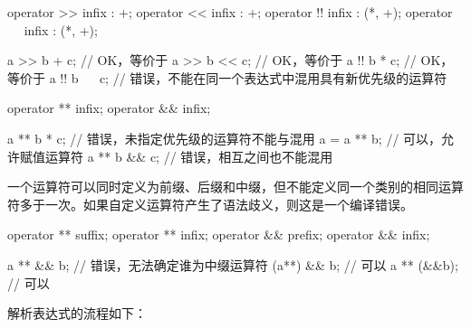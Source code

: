 \enterexample
\begin{codeblock}
operator >> infix : +;
operator << infix : +;
operator !! infix : (*, +);
operator ~~ infix : (*, +);

a >> b + c; // OK，等价于
a >> b << c; // OK，等价于
a !! b * c; // OK，等价于
a !! b ~~ c; // 错误，不能在同一个表达式中混用具有新优先级的运算符

operator ** infix;
operator && infix;

a ** b * c; // 错误，未指定优先级的运算符不能与\tcode{*}混用
a = a ** b; // 可以，允许赋值运算符
a ** b && c; // 错误，相互之间也不能混用
\end{codeblock}
\exitexample

\pnum
一个运算符可以同时定义为前缀、后缀和中缀，但不能定义同一个类别的相同运算符多于一次。如果自定义运算符产生了语法歧义，则这是一个编译错误。

\enterexample
\begin{codeblock}
operator ** suffix;
operator ** infix;
operator && prefix;
operator && infix;

a ** && b; // 错误，无法确定谁为中缀运算符
(a**) && b; // 可以
a ** (&&b); // 可以
\end{codeblock}
\exitexample

\pnum
解析表达式的流程如下：

